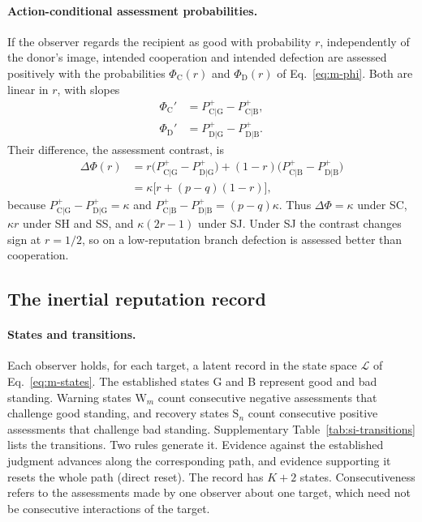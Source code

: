 \documentclass[10pt]{wlscirep}
\newcommand{\Lspace}{\mathscr{L}}          %
\newcommand{\st}[1]{\mathrm{#1}}           %
\newcommand{\Pp}[1]{P^{+}_{\mathrm{#1}}}   %
\newcommand{\PhiC}{\Phi_{\mathrm{C}}}
\newcommand{\PhiD}{\Phi_{\mathrm{D}}}
\theoremstyle{plain}
\theoremstyle{remark}
\begin{document}
\paragraph{Action-conditional assessment probabilities.} If the observer regards the recipient as good with probability $r$, independently of the donor's image, intended cooperation and intended defection are assessed positively with the probabilities $\PhiC(r)$ and $\PhiD(r)$ of Eq.~\eqref{eq:m-phi}. Both are linear in $r$, with slopes
\begin{equation}
\begin{aligned}
\PhiC'&=\Pp{C|G}-\Pp{C|B},\\
\PhiD'&=\Pp{D|G}-\Pp{D|B}.
\end{aligned}
\label{eq:s-phi-slopes}
\end{equation}
Their difference, the assessment contrast, is
\begin{equation}
\begin{aligned}
\Delta\Phi(r)&=r\bigl(\Pp{C|G}-\Pp{D|G}\bigr)+(1-r)\bigl(\Pp{C|B}-\Pp{D|B}\bigr)\\
&=\kappa\bigl[r+(p-q)(1-r)\bigr],
\end{aligned}
\label{eq:s-contrast}
\end{equation}
because $\Pp{C|G}-\Pp{D|G}=\kappa$ and $\Pp{C|B}-\Pp{D|B}=(p-q)\kappa$. Thus $\Delta\Phi=\kappa$ under SC, $\kappa r$ under SH and SS, and $\kappa(2r-1)$ under SJ. Under SJ the contrast changes sign at $r=1/2$, so on a low-reputation branch defection is assessed better than cooperation.

\subsection{The inertial reputation record}
\label{si:record}

\paragraph{States and transitions.} Each observer holds, for each target, a latent record in the state space $\Lspace$ of Eq.~\eqref{eq:m-states}. The established states G and B represent good and bad standing. Warning states $\st W_m$ count consecutive negative assessments that challenge good standing, and recovery states $\st S_n$ count consecutive positive assessments that challenge bad standing. Supplementary Table~\ref{tab:si-transitions} lists the transitions. Two rules generate it. Evidence against the established judgment advances along the corresponding path, and evidence supporting it resets the whole path (direct reset). The record has $K+2$ states. Consecutiveness refers to the assessments made by one observer about one target, which need not be consecutive interactions of the target.
\end{document}
